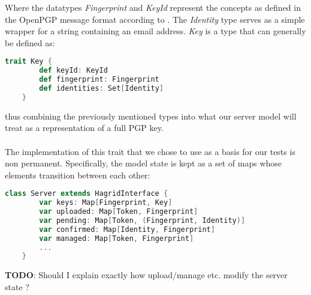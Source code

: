 Where the datatypes \emph{Fingerprint} and \emph{KeyId} represent the concepts as defined in the OpenPGP message format according to \cite{callas1998openpgp}. The \emph{Identity} type serves as a simple wrapper for a string containing an email address. \emph{Key} is a type that can generally be defined as: 
\begin{lstlisting}[language=Scala]
    trait Key {
        def keyId: KeyId
        def fingerprint: Fingerprint
        def identities: Set[Identity]
    }
\end{lstlisting}
thus combining the previously mentioned types into what our server model will treat as a representation of a full PGP key.
\\ \\
The implementation of this trait that we chose to use as a basis for our tests is non permanent. Specifically, the model state is kept as a set of maps whose elements transition between each other: 
\begin{lstlisting}[language=Scala]
    class Server extends HagridInterface {
        var keys: Map[Fingerprint, Key]
        var uploaded: Map[Token, Fingerprint]
        var pending: Map[Token, (Fingerprint, Identity)]
        var confirmed: Map[Identity, Fingerprint]
        var managed: Map[Token, Fingerprint]
        ...
    }
\end{lstlisting}

\textbf{TODO}: Should I explain exactly how upload/manage etc. modify the server state ?

